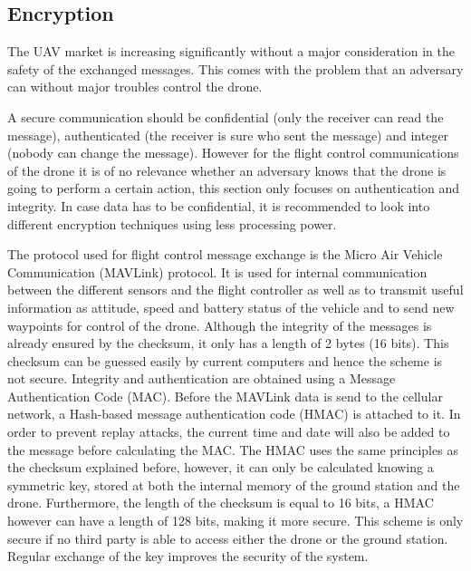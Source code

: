 \subsection{Encryption}%
\label{sec:encr}

The UAV market is increasing significantly without a major consideration in the safety of the exchanged messages. This comes with the problem that an adversary can without major troubles control the drone. 

A secure communication should be confidential (only the receiver can read the message), authenticated (the receiver is sure who sent the message) and integer (nobody can change the message). However for the flight control communications of the drone it is of no relevance whether an adversary knows that the drone is going to perform a certain action, this section only focuses on authentication and integrity. In case data has to be confidential, it is recommended to look into different encryption techniques using less processing power. 

The protocol used for flight control message exchange is the Micro Air Vehicle Communication (MAVLink) protocol. It is used for internal communication between the different sensors and the flight controller as well as to transmit useful information as attitude, speed and battery status of the vehicle and to send new waypoints for control of the drone. Although the integrity of the messages is already ensured by the checksum, it only has a length of 2 bytes (16 bits). This checksum can be guessed easily by current computers and hence the scheme is not secure.
Integrity and authentication are obtained using a Message Authentication Code (MAC). Before the MAVLink data is send to the cellular network, a Hash-based message authentication code (HMAC) is attached to it. In order to prevent replay attacks, the current time and date will also be added to the message before calculating the MAC. The HMAC uses the same principles as the checksum explained before, however, it can only be calculated knowing a symmetric key, stored at both the internal memory of the ground station and the drone.  Furthermore, the length of the checksum is equal to 16 bits, a HMAC however can have a length of 128 bits, making it more secure. This scheme is only secure if no third party is able to access either the drone or the ground station. Regular exchange of the key improves the security of the system.



